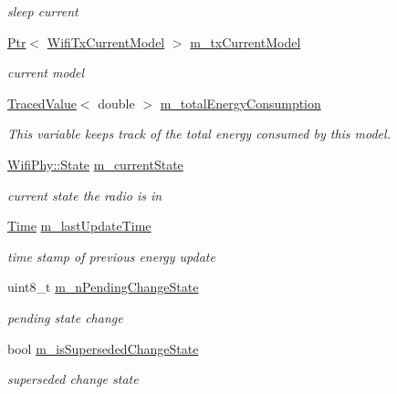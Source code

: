 \begin{DoxyCompactItemize}
\begin{DoxyCompactList}\small\item\em sleep current \end{DoxyCompactList}\item 
\hyperlink{classns3_1_1Ptr}{Ptr}$<$ \hyperlink{classns3_1_1WifiTxCurrentModel}{Wifi\+Tx\+Current\+Model} $>$ \hyperlink{classns3_1_1WifiRadioEnergyModel_addde3c71494589b051fc5e23ff8c6aa9}{m\+\_\+tx\+Current\+Model}
\begin{DoxyCompactList}\small\item\em current model \end{DoxyCompactList}\item 
\hyperlink{classns3_1_1TracedValue}{Traced\+Value}$<$ double $>$ \hyperlink{classns3_1_1WifiRadioEnergyModel_a56ee62d581f8a6b3ebf466e97d028568}{m\+\_\+total\+Energy\+Consumption}
\begin{DoxyCompactList}\small\item\em This variable keeps track of the total energy consumed by this model. \end{DoxyCompactList}\item 
\hyperlink{classns3_1_1WifiPhy_af97408fa76f99797497b492758467143}{Wifi\+Phy\+::\+State} \hyperlink{classns3_1_1WifiRadioEnergyModel_a3f7bc986f460d8d987a7104c71c952a4}{m\+\_\+current\+State}
\begin{DoxyCompactList}\small\item\em current state the radio is in \end{DoxyCompactList}\item 
\hyperlink{classns3_1_1Time}{Time} \hyperlink{classns3_1_1WifiRadioEnergyModel_a7ac51693b29b679aa09d76a3f78a231d}{m\+\_\+last\+Update\+Time}
\begin{DoxyCompactList}\small\item\em time stamp of previous energy update \end{DoxyCompactList}\item 
uint8\+\_\+t \hyperlink{classns3_1_1WifiRadioEnergyModel_afbe1f543be97f42adf5ef9cefb36bd58}{m\+\_\+n\+Pending\+Change\+State}
\begin{DoxyCompactList}\small\item\em pending state change \end{DoxyCompactList}\item 
bool \hyperlink{classns3_1_1WifiRadioEnergyModel_a5510491a9fe39122fb3e487ed6341aa0}{m\+\_\+is\+Superseded\+Change\+State}
\begin{DoxyCompactList}\small\item\em superseded change state \end{DoxyCompactList}\item 

\end{DoxyCompactItemize}
